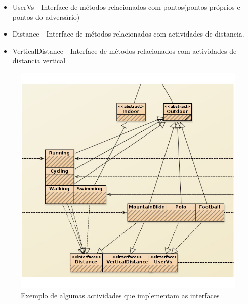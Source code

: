 \documentclass[10pt,notitlepage]{article}
\begin{document}
\begin{itemize}
\item UserVs - Interface de métodos relacionados com pontos(pontos próprios e pontos do adversário)
\item Distance - Interface de métodos relacionados com actividades de distancia.
\item VerticalDistance - Interface de métodos relacionados com actividades de distancia vertical

\end{itemize}
\begin{figure}[h]
\includegraphics[scale=0.5]{interfaceAct.jpg}
\caption{Exemplo de algumas actividades que implementam as interfaces}
\end{figure}
\end{document}
